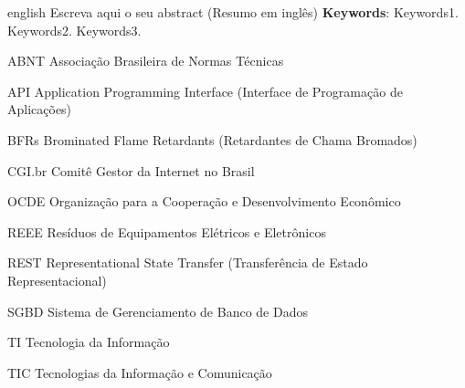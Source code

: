 \documentclass[
	12pt,				%
	openright,			%
	oneside,			%
	a4paper,			%
	english,			%
	brazil				%
	]{abntex2}
\theoremstyle{definition}
\begin{document}
\begin{resumo}[Abstract]
 \begin{otherlanguage*}{english}
   Escreva aqui o seu abstract (Resumo em inglês)
   \vspace{\onelineskip}
   \noindent 
   \textbf{Keywords}: Keywords1. Keywords2. Keywords3.
 \end{otherlanguage*}
\end{resumo}

\listoffigures*
\cleardoublepage{}

\listofquadros*
\cleardoublepage{}

\listoftables*
\cleardoublepage{}

\imprimirlistadealgoritmos{}
\cleardoublepage{}

\begin{siglas}
  \item[ABNT] Associação Brasileira de Normas Técnicas
  \item[API] Application Programming Interface (Interface de Programação de Aplicações)
  \item[BFRs] Brominated Flame Retardants (Retardantes de Chama Bromados)
  \item[CGI.br] Comitê Gestor da Internet no Brasil
  \item[OCDE] Organização para a Cooperação e Desenvolvimento Econômico
  \item[REEE] Resíduos de Equipamentos Elétricos e Eletrônicos
  \item[REST] Representational State Transfer (Transferência de Estado Representacional)
  \item[SGBD] Sistema de Gerenciamento de Banco de Dados
  \item[TI] Tecnologia da Informação
  \item[TIC] Tecnologias da Informação e Comunicação
\end{siglas}
\tableofcontents*
\cleardoublepage{}

\textual{}
\pagestyle{simple}

\end{document}
